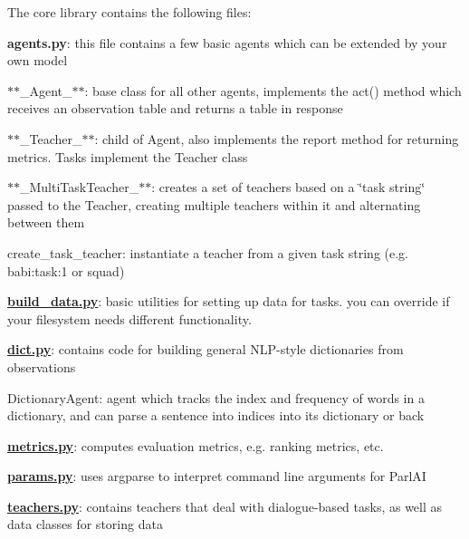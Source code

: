 The core library contains the following files\+:


\begin{DoxyItemize}
\item {\bfseries agents.\+py}\+: this file contains a few basic agents which can be extended by your own model
\begin{DoxyItemize}
\item $\ast$$\ast$\+\_\+\+Agent\+\_\+$\ast$$\ast$\+: base class for all other agents, implements the act() method which receives an observation table and returns a table in response
\item $\ast$$\ast$\+\_\+\+Teacher\+\_\+$\ast$$\ast$\+: child of Agent, also implements the report method for returning metrics. Tasks implement the Teacher class
\item $\ast$$\ast$\+\_\+\+Multi\+Task\+Teacher\+\_\+$\ast$$\ast$\+: creates a set of teachers based on a \char`\"{}task string\char`\"{} passed to the Teacher, creating multiple teachers within it and alternating between them
\item create\+\_\+task\+\_\+teacher\+: instantiate a teacher from a given task string (e.\+g. \textquotesingle{}babi\+:task\+:1\textquotesingle{} or \textquotesingle{}squad\textquotesingle{})
\end{DoxyItemize}
\item {\bfseries \hyperlink{build__data_8py}{build\+\_\+data.\+py}}\+: basic utilities for setting up data for tasks. you can override if your filesystem needs different functionality.
\item {\bfseries \hyperlink{dict_8py}{dict.\+py}}\+: contains code for building general N\+L\+P-\/style dictionaries from observations
\begin{DoxyItemize}
\item Dictionary\+Agent\+: agent which tracks the index and frequency of words in a dictionary, and can parse a sentence into indices into its dictionary or back
\end{DoxyItemize}
\item {\bfseries \hyperlink{metrics_8py}{metrics.\+py}}\+: computes evaluation metrics, e.\+g. ranking metrics, etc.
\item {\bfseries \hyperlink{params_8py}{params.\+py}}\+: uses argparse to interpret command line arguments for Parl\+AI
\item {\bfseries \hyperlink{teachers_8py}{teachers.\+py}}\+: contains teachers that deal with dialogue-\/based tasks, as well as data classes for storing data
\begin{DoxyItemize}

\end{DoxyItemize}
\end{DoxyItemize}
